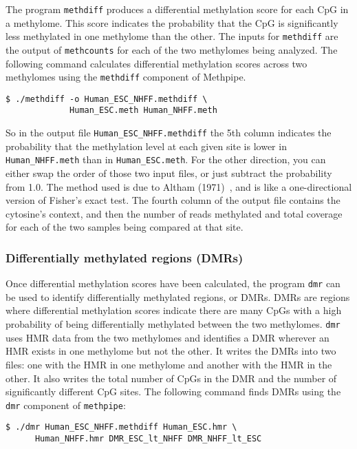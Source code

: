 \documentclass[10pt]{article}
\newcommand{\meth}{\texttt{methpipe}}
\newcommand{\prog}[1]{\texttt{#1}}
\newcommand{\fn}[1]{\texttt{#1}}
\begin{document}
The program \prog{methdiff} produces a differential methylation score
for each CpG in a methylome. This score indicates the probability that
the CpG is significantly less methylated in one methylome than the
other. The inputs for \prog{methdiff} are the output of
\prog{methcounts} for each of the two methylomes being analyzed. The
following command calculates differential methylation scores across
two methylomes using the \prog{methdiff} component of Methpipe.
\begin{verbatim}
$ ./methdiff -o Human_ESC_NHFF.methdiff \
             Human_ESC.meth Human_NHFF.meth
\end{verbatim}
So in the output file \fn{Human\_ESC\_NHFF.methdiff} the 5th
column indicates the probability that the methylation level at each
given site is lower in \fn{Human\_NHFF.meth} than in
\fn{Human\_ESC.meth}. For the other direction, you can either
swap the order of those two input files, or just subtract the
probability from 1.0. The method used is due to Altham
(1971)~\cite{altham1969exact}, and is like a one-directional version
of Fisher's exact test. The fourth column of the output file contains
the cytosine's context, and then the number of reads methylated and
total coverage for each of the two samples being compared at that site.

\subsubsection{Differentially methylated regions (DMRs)}
\label{sec:dmr}

Once differential methylation scores have been calculated, the program
\prog{dmr} can be used to identify differentially methylated regions,
or DMRs. DMRs are regions where differential methylation scores
indicate there are many CpGs with a high probability of being
differentially methylated between the two methylomes.
\prog{dmr} uses HMR data from the two methylomes and identifies
a DMR wherever an HMR exists in one methylome but not the other.
It writes the DMRs into two files: one with the HMR in one methylome
and another with the HMR in the other.  It also writes the total number
of CpGs in the DMR and the number of significantly different CpG sites.
The following command finds DMRs using the \prog{dmr} component
of \meth{}:
\begin{verbatim}
$ ./dmr Human_ESC_NHFF.methdiff Human_ESC.hmr \
      Human_NHFF.hmr DMR_ESC_lt_NHFF DMR_NHFF_lt_ESC
\end{verbatim}
\end{document}
